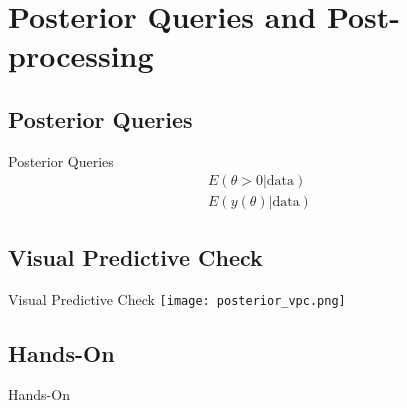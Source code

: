
\section{Posterior Queries and Post-processing}
\subsection{Posterior Queries}
\begin{frame}{Posterior Queries}
    $$
    \begin{aligned}
        E(\theta > 0 | \text{data}) \\
        E(y(\theta) | \text{data})
    \end{aligned}
    $$
\end{frame}

\subsection{Visual Predictive Check}
\begin{frame}{Visual Predictive Check}
    \centering
    \texttt{[image: posterior\_vpc.png]}
\end{frame}

\subsection{Hands-On}
\begin{frame}{Hands-On}
\end{frame}
